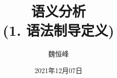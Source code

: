 \documentclass[]{beamer}
\title[语义分析]{语义分析 \\ (1. 语法制导定义)}
\author[魏恒峰]{\large 魏恒峰}
\institute{hfwei@nju.edu.cn}
\date{2021年12月07日}
\begin{document}
\maketitle



% 
% 

\thankyou{}

\end{document}
